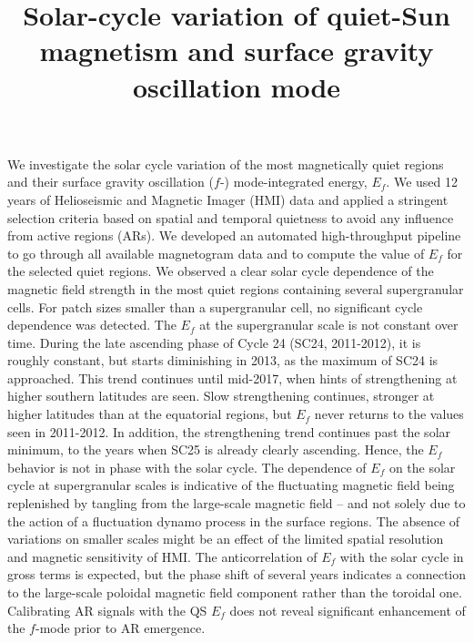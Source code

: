 \documentclass{aa}
\begin{document}
\title{Solar-cycle variation of quiet-Sun magnetism and surface gravity oscillation mode}



{We investigate the solar cycle variation of the most magnetically quiet regions and
their surface gravity oscillation ($f$-) mode-integrated 
energy, $E_f$.
}
{We used 12 years of Helioseismic and Magnetic Imager (HMI) data and applied a stringent selection criteria based on
spatial and temporal quietness to avoid any influence from active regions (ARs).
We developed an automated high-throughput pipeline to go through all available magnetogram data
and to compute the value of 
$E_f$
for the selected quiet regions.}
{We observed a clear solar cycle dependence of the magnetic field strength in the most
quiet regions containing several supergranular cells. For patch sizes smaller than a supergranular
cell, no significant cycle dependence was detected. The $E_f$ at the supergranular scale 
is not constant over time.
During the late ascending phase of Cycle 24 (SC24, 2011-2012), it is roughly constant, but starts diminishing in 2013, as the maximum of SC24 is approached. This trend continues
until 
mid-2017,
when
hints of strengthening at higher southern latitudes
are seen.
Slow strengthening continues, stronger at higher latitudes than at the equatorial regions, but $E_f$ never returns to the values seen in 2011-2012. In addition, the strengthening trend continues past the solar minimum, to the years when SC25 is already clearly ascending. Hence, the $E_f$ behavior is not in phase with the solar cycle.
}
{
The dependence of $E_f$ on the solar cycle at supergranular scales
is indicative of the fluctuating magnetic
field being replenished by tangling from the large-scale magnetic field -- and not solely due to
the action of a fluctuation dynamo process in the surface regions. 
The absence of variations on smaller scales might be an effect of the
limited spatial resolution and magnetic sensitivity of HMI.
The 
anticorrelation of $E_f$ with the solar cycle in gross terms is expected, but the phase shift of several years indicates a connection to the large-scale poloidal magnetic field component rather than the toroidal one. Calibrating AR signals with the QS $E_f$ does not reveal significant enhancement of the $f$-mode prior to AR emergence.
}
\end{document}
